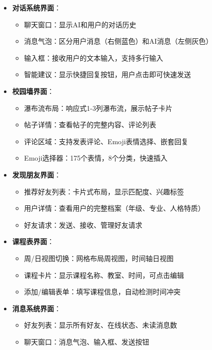 \documentclass[12pt,a4paper]{article}
\begin{document}
\begin{itemize}
    \item \textbf{对话系统界面}：
        \begin{itemize}
            \item 聊天窗口：显示AI和用户的对话历史
            \item 消息气泡：区分用户消息（右侧蓝色）和AI消息（左侧灰色）
            \item 输入框：接收用户的文本输入，支持多行输入
            \item 智能建议：显示快捷回复按钮，用户点击即可快速发送
        \end{itemize}
    
    \item \textbf{校园墙界面}：
        \begin{itemize}
            \item 瀑布流布局：响应式1-3列瀑布流，展示帖子卡片
            \item 帖子详情：查看帖子的完整内容、评论列表
            \item 评论区域：支持发表评论、Emoji表情选择、嵌套回复
            \item Emoji选择器：175个表情，8个分类，快速插入
        \end{itemize}
    
    \item \textbf{发现朋友界面}：
        \begin{itemize}
            \item 推荐好友列表：卡片式布局，显示匹配度、兴趣标签
            \item 用户详情：查看用户的完整档案（年级、专业、人格特质）
            \item 好友请求：发送、接收、管理好友请求
        \end{itemize}
    
    \item \textbf{课程表界面}：
        \begin{itemize}
            \item 周/日视图切换：网格布局周视图，时间轴日视图
            \item 课程卡片：显示课程名称、教室、时间，可点击编辑
            \item 添加/编辑表单：填写课程信息，自动检测时间冲突
        \end{itemize}
    
    \item \textbf{消息系统界面}：
        \begin{itemize}
            \item 好友列表：显示所有好友、在线状态、未读消息数
            \item 聊天窗口：消息气泡、输入框、发送按钮
        \end{itemize}
\end{itemize}
\end{document}
